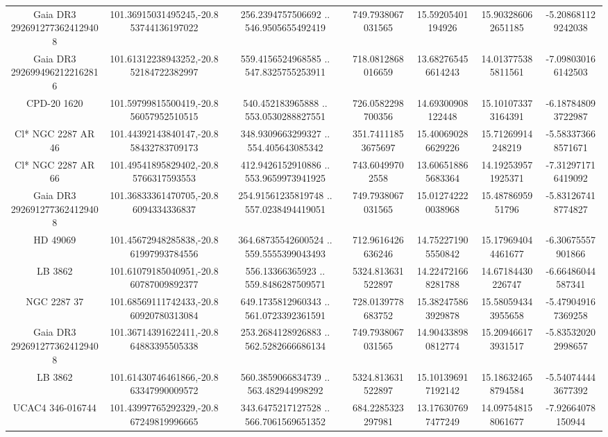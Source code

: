 \begin{table}
\begin{tabular}{ccccccc}
Gaia DR3 2926912773624129408 & 101.36915031495245,-20.853744136197022 & 256.2394757506692 .. 546.9505655492419 & 749.7938067031565 & 15.59205401194926 & 15.903286062651185 & -5.208681129242038 \\
Gaia DR3 2926994962122162816 & 101.61312238943252,-20.852184722382997 & 559.4156524968585 .. 547.8325755253911 & 718.0812868016659 & 13.682765456614243 & 14.013775385811561 & -7.098030166142503 \\
CPD-20  1620 & 101.59799815500419,-20.856057952510515 & 540.452183965888 .. 553.0530288827551 & 726.0582298700356 & 14.69300908122448 & 15.101073373164391 & -6.187848093722987 \\
Cl* NGC 2287     AR      46 & 101.44392143840147,-20.858432783709173 & 348.9309663299327 .. 554.405643085342 & 351.74111853675697 & 15.400690286629226 & 15.71269914248219 & -5.583373668571671 \\
Cl* NGC 2287     AR      66 & 101.49541895829402,-20.85766317593553 & 412.9426152910886 .. 553.9659973941925 & 743.60499702558 & 13.606518865683364 & 14.192539571925371 & -7.312971716419092 \\
Gaia DR3 2926912773624129408 & 101.36833361470705,-20.86094334336837 & 254.91561235819748 .. 557.0238494419051 & 749.7938067031565 & 15.012742220038968 & 15.4878695951796 & -5.831267418774827 \\
HD  49069 & 101.45672948285838,-20.861997993784556 & 364.68735542600524 .. 559.5555399043493 & 712.9616426636246 & 14.752271905550842 & 15.179694044461677 & -6.30675557901866 \\
LB  3862 & 101.61079185040951,-20.860787009892377 & 556.13366365923 .. 559.8486287509571 & 5324.813631522897 & 14.224721668281788 & 14.67184430226747 & -6.66486044587341 \\
NGC  2287    37 & 101.68569111742433,-20.860920780313084 & 649.1735812960343 .. 561.0723392361591 & 728.0139778683752 & 15.382475863929878 & 15.580594343955658 & -5.479049167369258 \\
Gaia DR3 2926912773624129408 & 101.36714391622411,-20.864883395505338 & 253.2684128926883 .. 562.5282666686134 & 749.7938067031565 & 14.904338980812774 & 15.209466173931517 & -5.835320202998657 \\
LB  3862 & 101.61430746461866,-20.863347990009572 & 560.3859066834739 .. 563.482944998292 & 5324.813631522897 & 15.101396917192142 & 15.186324658794584 & -5.540744443677392 \\
UCAC4 346-016744 & 101.43997765292329,-20.867249819996665 & 343.6475217127528 .. 566.7061569651352 & 684.2285323297981 & 13.176307697477249 & 14.097548158061677 & -7.92664078150944 \\

\end{tabular}
\end{table}
